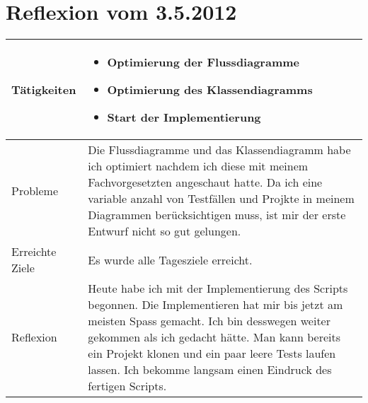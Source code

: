 
\begin{table}
\section{Reflexion vom 3.5.2012}
\begin{tabular}{| l | p{12cm} |}
    \hline
    Tätigkeiten &
    \begin{itemize}
        \item Optimierung der Flussdiagramme  
        \item Optimierung des Klassendiagramms
        \item Start der Implementierung
    \end{itemize}  \\
    \hline
    Probleme & 
    Die Flussdiagramme und das Klassendiagramm habe ich optimiert nachdem ich diese mit meinem Fachvorgesetzten angeschaut hatte. Da ich eine variable anzahl von Testfällen und Projkte in meinem Diagrammen berücksichtigen muss, 
    ist mir der erste Entwurf nicht so gut gelungen. \\
    \hline
    Erreichte Ziele &
    Es wurde alle Tagesziele erreicht. \\
    \hline 
    Reflexion &
    Heute habe ich mit der Implementierung des Scripts begonnen. Die Implementieren hat mir bis jetzt am meisten Spass gemacht. Ich bin desswegen weiter gekommen als ich gedacht hätte. Man kann bereits ein Projekt klonen 
    und ein paar leere Tests laufen lassen. Ich bekomme langsam einen Eindruck des fertigen Scripts. \\
    \hline
\end{tabular}
\end{table}

\clearpage
